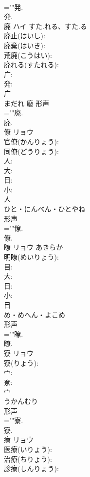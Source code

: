 \documentclass[8pt]{extreport}
\begin{document}
\begin{CJK}{UTF8}{min}
\\	=""発.
\\	発.
\\	廃	ハイ	すた.れる、すた.る		
\\	廃止(はいし): 
\\	廃棄(はいき): 
\\	荒廃(こうはい): 
\\	廃れる(すたれる): 
\\	广: 
\\	発: 
\\	广	
\\	まだれ	廢	形声 
\\	=""廃.
\\	廃.
\\	僚	リョウ			
\\	官僚(かんりょう): 
\\	同僚(どうりょう): 
\\	人: 
\\	大: 
\\	日: 
\\	小: 
\\	人	
\\	ひと・にんべん・ひとやね	
\\	形声 
\\	=""僚.
\\	僚.
\\	瞭	リョウ	あきらか		
\\	明瞭(めいりょう): 
\\	目: 
\\	大: 
\\	日: 
\\	小: 
\\	目	
\\	め・めへん・よこめ	
\\	形声 
\\	=""瞭.
\\	瞭.
\\	寮	リョウ			
\\	寮(りょう): 
\\	宀: 
\\	尞: 
\\	宀	
\\	うかんむり	
\\	形声 
\\	=""寮.
\\	寮.
\\	療	リョウ			
\\	医療(いりょう): 
\\	治療(ちりょう): 
\\	診療(しんりょう): 

\end{CJK}
\end{document}
